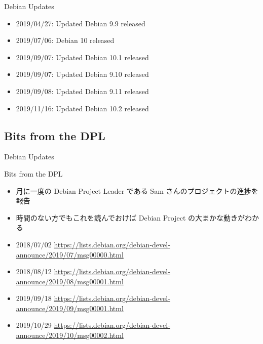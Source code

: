 \begin{frame}{Debian Updates}%

\begin{itemize}
\item 2019/04/27:  Updated Debian 9.9  released
\item 2019/07/06:  Debian 10 released
\item 2019/09/07:  Updated Debian 10.1 released
\item 2019/09/07:  Updated Debian 9.10 released
\item 2019/09/08:  Updated Debian 9.11 released
\item 2019/11/16:  Updated Debian 10.2 released
\end{itemize}

\end{frame}


\subsection{Bits from the DPL}

\begin{frame}{Debian Updates}%

Bits from the DPL

\begin{itemize}
\item 月に一度の Debian Project Leader である Sam さんのプロジェクトの進捗を報告
\item 時間のない方でもこれを読んでおけば Debian Project の大まかな動きがわかる
\end{itemize}

\small{
\begin{itemize}

\item 2018/07/02 \url{https://lists.debian.org/debian-devel-announce/2019/07/msg00000.html}
\item 2018/08/12 \url{https://lists.debian.org/debian-devel-announce/2019/08/msg00001.html}
\item 2019/09/18 \url{https://lists.debian.org/debian-devel-announce/2019/09/msg00001.html}
\item 2019/10/29 \url{https://lists.debian.org/debian-devel-announce/2019/10/msg00002.html}

\end{itemize}
}

\end{frame}


